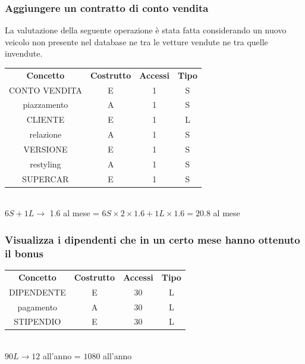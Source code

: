 \documentclass[12pt]{article}
\begin{document}
\subsubsection{Aggiungere un contratto di conto vendita}

La valutazione della seguente operazione è stata fatta considerando un nuovo
veicolo non presente nel database ne tra le vetture vendute ne tra quelle
invendute.

\begin{table}[H]
    \centering
    \begin{tabular}{ c c c c } 
        \rowcolor{red!20!}
        \textbf{Concetto} & \textbf{Costrutto} & \textbf{Accessi} &
        \textbf{Tipo}\\ 
        CONTO VENDITA & E & 1 & S \\ 
        piazzamento & A & 1 & S \\
        CLIENTE & E & 1 & L \\ 
        relazione & A & 1 & S \\
        VERSIONE & E & 1 & S \\ 
        restyling & A & 1 & S \\
        SUPERCAR & E & 1 & S \\ 
    \end{tabular}\\
    \(6S + 1L \rightarrow \) 1.6 al mese = \( 6S \times 2 \times 1.6 + 1L \times
    1.6 = 20.8 \) al mese  
\end{table}

\subsubsection{Visualizza i dipendenti che in un certo mese hanno ottenuto il
bonus} 

\begin{table}[H]
    \centering
    \begin{tabular}{ c c c c } 
        \rowcolor{red!20!}
        \textbf{Concetto} & \textbf{Costrutto} & \textbf{Accessi} &
        \textbf{Tipo}\\ 
        DIPENDENTE & E & 30 & L \\ 
        pagamento & A & 30 & L \\
        STIPENDIO & E & 30 & L \\ 
    \end{tabular}\\
    \( 90L \rightarrow 12 \) all'anno = \( 1080 \) all'anno
\end{table}
\end{document}
